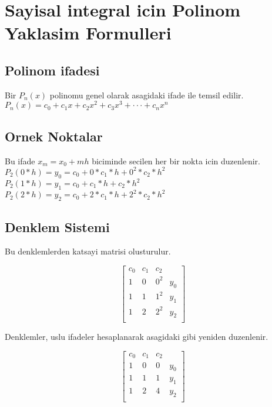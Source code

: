 \documentclass{article}
\begin{document}
\setlength\parindent{0pt}
\section{Sayisal integral icin Polinom Yaklasim Formulleri}
\subsection{Polinom ifadesi}
Bir $P_{n}(x)$ polinomu genel olarak asagidaki ifade ile temsil edilir.\\
$\displaystyle P_{n}(x)= c_{0}+c_{1}x+c_{2}x^{2}+c_{3}x^{3}+\cdot\cdot\cdot+c_{n}x^{n}$
\subsection{Ornek Noktalar}
Bu ifade $x_{m}=x_{0}+mh$ biciminde secilen her bir nokta icin duzenlenir.\\
$\displaystyle P_{2}(0*h)=y_{0}=c_{0}+0*c_{1}*h+0^{2}*c_{2}*h^{2}$\\
$\displaystyle P_{2}(1*h)=y_{1}=c_{0}+c_{1}*h+c_{2}*h^{2}$\\
$\displaystyle P_{2}(2*h)=y_{2}=c_{0}+2*c_{1}*h+2^{2}*c_{2}*h^{2}$\\
\subsection{Denklem Sistemi}
Bu denklemlerden katsayi matrisi olusturulur.
\begin{center}
$$ \left[\begin{array}{rrr|r}
c_{0} & c_{1} & c_{2}\\
1 & 0 & 0^{2} & y_{0}\\
1 & 1 & 1^{2} & y_{1}\\
1 & 2 & 2^{2} & y_{2}\\
\end{array}\right] $$
\end{center}
Denklemler, uslu ifadeler hesaplanarak asagidaki gibi yeniden duzenlenir.
\begin{center}
$$ \left[\begin{array}{rrr|r}
c_{0} & c_{1} & c_{2}\\
1 & 0 & 0 & y_{0}\\
1 & 1 & 1 & y_{1}\\
1 & 2 & 4 & y_{2}\\
\end{array}\right] $$
\end{center}
\end{document}
